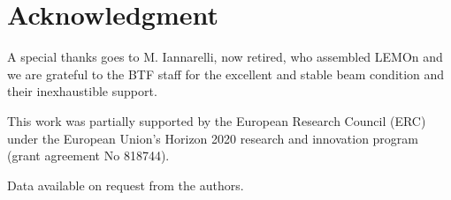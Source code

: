 \documentclass[%
 aip,
 amsmath,amssymb,
 reprint,%
]{revtex4-1}
\begin{document}
\section*{Acknowledgment}
A special thanks goes to M. Iannarelli, now retired, who assembled LEMOn and we are grateful to the BTF staff for the excellent and stable beam condition and their inexhaustible support.

This work was partially supported by the European Research Council (ERC) under the European Union’s Horizon 2020 research and innovation program (grant agreement No 818744).

Data available on request from the authors.



\nocite{*}
\end{document}
